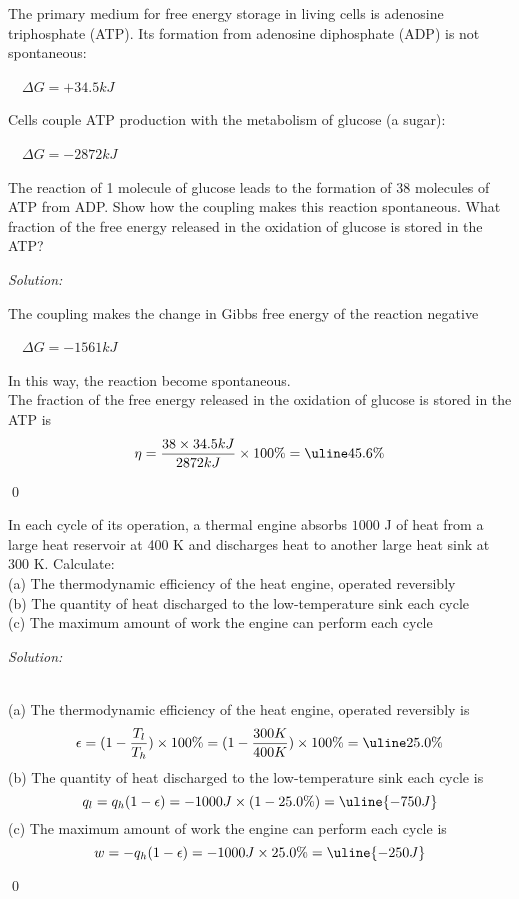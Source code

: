 \documentclass[12pt]{article}
\newenvironment{problem}[2][Problem]{\begin{trivlist}
\item[\hskip \labelsep {\bfseries #1}\hskip \labelsep {\bfseries #2.}]}{\end{trivlist}}
\newenvironment{sol}
    {\emph{Solution:}
    }
    {
    \qed
    }
\begin{document}
\begin{problem}{13.34}
The primary medium for free energy storage in living cells is adenosine triphosphate (ATP). Its formation from adenosine diphosphate (ADP) is not spontaneous:
\begin{center}
~~$\Delta G=+34.5kJ$
\end{center}
Cells couple ATP production with the metabolism of glucose (a sugar):
\begin{center}
~~$\Delta G=-2872kJ$
\end{center}
The reaction of 1 molecule of glucose leads to the formation of 38 molecules of ATP from ADP. Show how the coupling makes this reaction spontaneous. What fraction of the free energy released in the oxidation of glucose is stored in the ATP?
\end{problem}
\begin{sol}
The coupling makes the change in Gibbs free energy of the reaction negative
\begin{center}
~~$\Delta G=-1561kJ$
\end{center}
In this way, the reaction become spontaneous.\\
The fraction of the free energy released in the oxidation of glucose is stored in the ATP is
\[
\eta=\frac{38\times34.5kJ}{2872kJ}\times100\%=\uline{45.6\%}
\]
\end{sol}

\begin{problem}{13.40}
In each cycle of its operation, a thermal engine absorbs $1000$ J of heat from a large heat reservoir at 400 K and discharges heat to another large heat sink at $300$ K. Calculate:\\
(a) The thermodynamic efficiency of the heat engine, operated reversibly\\
(b) The quantity of heat discharged to the low-temperature sink each cycle\\
(c) The maximum amount of work the engine can perform each cycle
\end{problem}
\begin{sol}
\\(a) The thermodynamic efficiency of the heat engine, operated reversibly is
\[
\epsilon=(1-\frac{T_l}{T_h})\times100\%=(1-\frac{300K}{400K})\times100\%=\uline{25.0\%}
\]
(b) The quantity of heat discharged to the low-temperature sink each cycle is
\[
q_l=q_h(1-\epsilon)=-1000J\times(1-25.0\%)=\uline{-750J}
\]
(c) The maximum amount of work the engine can perform each cycle is
\[
w=-q_h(1-\epsilon)=-1000J\times25.0\%=\uline{-250J}
\]
\end{sol}
\end{document}
